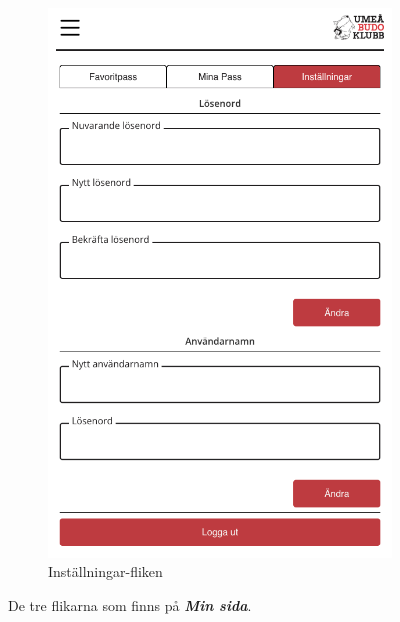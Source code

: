 \documentclass{article}
\newcommand{\term}[1]{\textcolor{secondary}{\textit{\textbf{#1}}}}
\begin{document}
{\begin{figure}[h]
{\begin{subfigure}[b]{0.3\textwidth}
                 \includegraphics[width=\textwidth]{images/Screens/UserSettings.png}
                 \caption{Inställningar-fliken}
                 \label{fig:userSettings}
             \end{subfigure}
             }
        \caption{De tre flikarna som finns på \term{Min sida}.}
        \label{fig:userFig}
    \end{figure}

}
\end{document}
